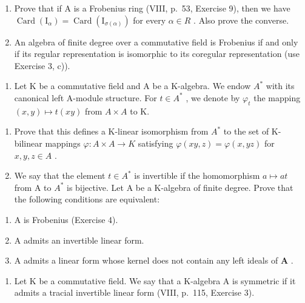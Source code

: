 \begin{enumerate}
\def\labelenumi{\alph{enumi})}
\item
  Prove that if A is a Frobenius ring (VIII, p.~53, Exercise 9), then we have \(\operatorname{Card}(\mathrm{I}_{\alpha}) = \operatorname{Card}(\mathrm{I}_{\sigma(\alpha)})\) for every \(\alpha \in R\) . Also prove the converse.
\item
  An algebra of finite degree over a commutative field is Frobenius if and only if its regular representation is isomorphic to its coregular representation (use Exercise 3, c)).
\end{enumerate}

\begin{enumerate}
\def\labelenumi{\arabic{enumi})}
\setcounter{enumi}{4}
\tightlist
\item
  Let K be a commutative field and A be a K-algebra. We endow \(A^{*}\) with its canonical left A-module structure. For \(t \in A^{*}\) , we denote by \(\varphi_{t}\) the mapping \((x, y) \mapsto t(xy)\) from \(A \times A\) to K.
\end{enumerate}

\begin{enumerate}
\def\labelenumi{\alph{enumi})}
\item
  Prove that this defines a K-linear isomorphism from \(A^{*}\) to the set of K-bilinear mappings \(\varphi: A \times A \to K\) satisfying \(\varphi(xy, z) = \varphi(x, yz)\) for \(x, y, z \in A\) .
\item
  We say that the element \(t \in A^{*}\) is invertible if the homomorphism \(a \mapsto at\) from A to \(A^{*}\) is bijective. Let A be a K-algebra of finite degree. Prove that the following conditions are equivalent:
\end{enumerate}

\begin{enumerate}
\def\labelenumi{(\roman{enumi})}
\item
  A is Frobenius (Exercise 4).
\item
  A admits an invertible linear form.
\item
  A admits a linear form whose kernel does not contain any left ideals of \(\mathbf{A}\) .
\end{enumerate}

\begin{enumerate}
\def\labelenumi{\arabic{enumi})}
\setcounter{enumi}{5}
\tightlist
\item
  Let K be a commutative field. We say that a K-algebra A is symmetric if it admits a tracial invertible linear form (VIII, p.~115, Exercise 3).
\end{enumerate}

